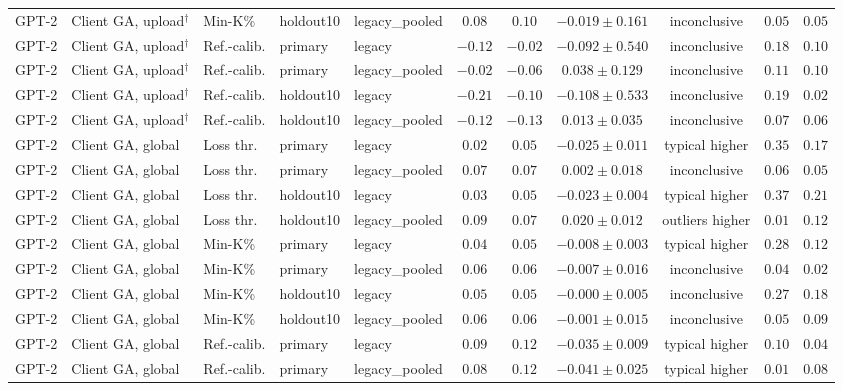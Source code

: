 \begin{table}[t]
\begin{tabular*}{\textwidth}{@{\extracolsep{\fill}}lllllcccccc@{}}
GPT-2 & Client GA, upload$^{\dagger}$ & Min-K\% & holdout10 & legacy\_pooled & $0.08$ & $0.10$ & $-0.019 \pm 0.161$ & inconclusive & $0.05$ & $0.05$ \\
GPT-2 & Client GA, upload$^{\dagger}$ & Ref.-calib. & primary & legacy & $-0.12$ & $-0.02$ & $-0.092 \pm 0.540$ & inconclusive & $0.18$ & $0.10$ \\
GPT-2 & Client GA, upload$^{\dagger}$ & Ref.-calib. & primary & legacy\_pooled & $-0.02$ & $-0.06$ & $0.038 \pm 0.129$ & inconclusive & $0.11$ & $0.10$ \\
GPT-2 & Client GA, upload$^{\dagger}$ & Ref.-calib. & holdout10 & legacy & $-0.21$ & $-0.10$ & $-0.108 \pm 0.533$ & inconclusive & $0.19$ & $0.02$ \\
GPT-2 & Client GA, upload$^{\dagger}$ & Ref.-calib. & holdout10 & legacy\_pooled & $-0.12$ & $-0.13$ & $0.013 \pm 0.035$ & inconclusive & $0.07$ & $0.06$ \\
GPT-2 & Client GA, global & Loss thr. & primary & legacy & $0.02$ & $0.05$ & $-0.025 \pm 0.011$ & typical higher & $0.35$ & $0.17$ \\
GPT-2 & Client GA, global & Loss thr. & primary & legacy\_pooled & $0.07$ & $0.07$ & $0.002 \pm 0.018$ & inconclusive & $0.06$ & $0.05$ \\
GPT-2 & Client GA, global & Loss thr. & holdout10 & legacy & $0.03$ & $0.05$ & $-0.023 \pm 0.004$ & typical higher & $0.37$ & $0.21$ \\
GPT-2 & Client GA, global & Loss thr. & holdout10 & legacy\_pooled & $0.09$ & $0.07$ & $0.020 \pm 0.012$ & outliers higher & $0.01$ & $0.12$ \\
GPT-2 & Client GA, global & Min-K\% & primary & legacy & $0.04$ & $0.05$ & $-0.008 \pm 0.003$ & typical higher & $0.28$ & $0.12$ \\
GPT-2 & Client GA, global & Min-K\% & primary & legacy\_pooled & $0.06$ & $0.06$ & $-0.007 \pm 0.016$ & inconclusive & $0.04$ & $0.02$ \\
GPT-2 & Client GA, global & Min-K\% & holdout10 & legacy & $0.05$ & $0.05$ & $-0.000 \pm 0.005$ & inconclusive & $0.27$ & $0.18$ \\
GPT-2 & Client GA, global & Min-K\% & holdout10 & legacy\_pooled & $0.06$ & $0.06$ & $-0.001 \pm 0.015$ & inconclusive & $0.05$ & $0.09$ \\
GPT-2 & Client GA, global & Ref.-calib. & primary & legacy & $0.09$ & $0.12$ & $-0.035 \pm 0.009$ & typical higher & $0.10$ & $0.04$ \\
GPT-2 & Client GA, global & Ref.-calib. & primary & legacy\_pooled & $0.08$ & $0.12$ & $-0.041 \pm 0.025$ & typical higher & $0.01$ & $0.08$ \\

\end{tabular*}
\end{table}
